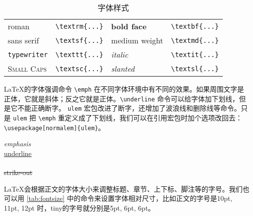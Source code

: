 \begin{table}[htbp]
\centering
\caption{字体样式}
\label{tab:font_style}
\begin{tabular}{llll}
  \toprule
  \textrm{roman} & \verb|\textrm{...}| & 
    \textbf{bold face} & \verb|\textbf{...}| \\
  \textsf{sans serif} & \verb|\textsf{...}| & 
    \textmd{medium weight} & \verb|\textmd{...}| \\
  \texttt{typewriter} & \verb|\texttt{...}| & 
    \textit{italic} & \verb|\textit{...}| \\
  \textsc{Small Caps} & \verb|\textsc{...}| & 
    \textsl{slanted} & \verb|\textsl{...}| \\
  \bottomrule
\end{tabular}
\end{table}

\LaTeX 的字体强调命令 \verb|\emph| 在不同字体环境中有不同的效果。如果周围文字是正体，它就是斜体；反之它就是正体。\verb|\underline| 命令可以给字体加下划线，但是它不能正确断字。 \texttt{ulem} 宏包改进了断字，还增加了波浪线和删除线等命令。只是 \texttt{ulem} 把 \verb|\emph| 重定义成了下划线，我们可以在引用宏包时加个选项改回去：\verb|\usepackage[normalem]{ulem}|。

\begin{example}[htbp]
\begin{RLDemo}[]
\emph{emphasis}\\
\uline{underline}\\
\\
\sout{strike-out}
\end{RLDemo}
\caption{字体强调和下划线}
\end{example}

\LaTeX 会根据正文的字体大小来调整标题、章节、上下标、脚注等的字号。我们也可以用 \autoref{tab:fontsize} 中的命令来设置字体相对尺寸，比如正文的字号是10pt, 11pt, 12pt 时，tiny的字号就分别是5pt, 6pt, 6pt。

